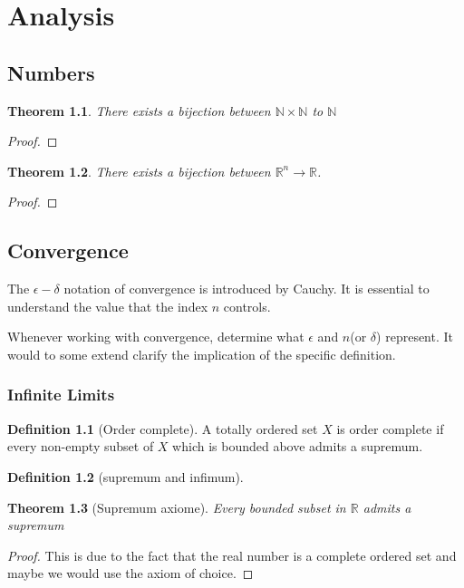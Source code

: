\documentclass[12pt,fleqn]{book}
\newtheorem{theorem}{Theorem}[section]
\theoremstyle{definition}
\newtheorem{definition}{Definition}[section]
\begin{document}
\chapter{Analysis}
\section{Numbers}
\begin{theorem}
	There exists a bijection between $\mathbb{N} \times \mathbb{N}$ to $\mathbb{N}$
\end{theorem}
\begin{proof}
\end{proof}

\begin{theorem}
	There exists a bijection between $\mathbb{R}^n \rightarrow \mathbb{R}$.
\end{theorem}
\begin{proof}
\end{proof}


\section{Convergence}
The $\epsilon-\delta$ notation of convergence is introduced by Cauchy. It is essential to understand the value that the index $n$ controls.\par 
Whenever working with convergence, determine what $\epsilon$ and $n$(or $\delta$) represent. It would to some extend clarify the implication of the specific definition.


\subsection{Infinite Limits}

\begin{definition}[Order complete]
	A totally ordered set $X$ is order complete if every non-empty subset of $X$ which is bounded above admits a supremum.
\end{definition}

\begin{definition}[supremum and infimum]
	
\end{definition}

\begin{theorem}[Supremum axiome]
	Every bounded subset in $\mathbb{R}$ admits a supremum
\end{theorem}
\begin{proof}
	This is due to the fact that the real number is a complete ordered set and maybe we would use the axiom of choice.
\end{proof}
\end{document}
